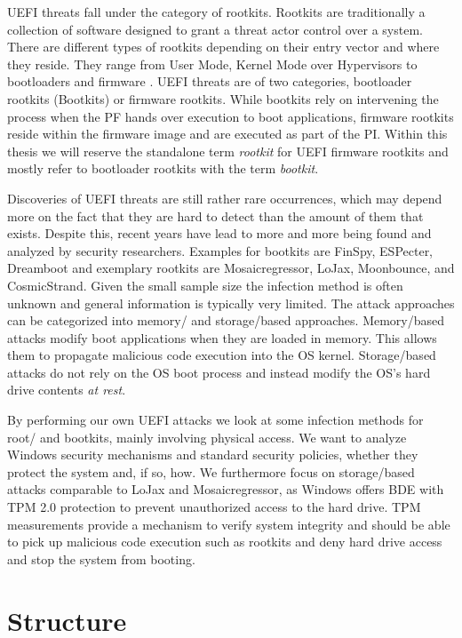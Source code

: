 \ac{UEFI} threats fall under the category of rootkits.
Rootkits are traditionally a collection of software designed to grant a threat actor control over a system.
There are different types of rootkits depending on their entry vector and where they reside.
They range from User Mode, Kernel Mode over Hypervisors to bootloaders and firmware \cite{crowdstrike, techtarget, microsoft-secure-the-windows-boot-process}.
\ac{UEFI} threats are of two categories, bootloader rootkits (Bootkits) or firmware rootkits.
While bootkits rely on intervening the process when the \ac{PF} hands over execution to boot applications, firmware rootkits reside within the firmware image and are executed as part of the \ac{PI}.
Within this thesis we will reserve the standalone term \emph{rootkit} for \ac{UEFI} firmware rootkits and mostly refer to bootloader rootkits with the term \emph{bootkit}.

Discoveries of \ac{UEFI} threats are still rather rare occurrences, which may depend more on the fact that they are hard to detect than the amount of them that exists.
Despite this, recent years have lead to more and more being found and analyzed by security researchers.
Examples for bootkits are FinSpy, ESPecter, Dreamboot and exemplary rootkits are Mosaicregressor, LoJax, Moonbounce, and CosmicStrand.
Given the small sample size the infection method is often unknown and general information is typically very limited.
The attack approaches can be categorized into memory\-/ and storage\-/based approaches.
Memory\-/based attacks modify boot applications when they are loaded in memory.
This allows them to propagate malicious code execution into the \ac{OS} kernel.
Storage\-/based attacks do not rely on the \ac{OS} boot process and instead modify the \ac{OS}'s hard drive contents \emph{at rest}.

By performing our own \ac{UEFI} attacks we look at some infection methods for root\-/ and bootkits, mainly involving physical access.
We want to analyze Windows security mechanisms and standard security policies, whether they protect the system and, if so, how.
We furthermore focus on storage\-/based attacks comparable to LoJax and Mosaicregressor, as Windows offers \ac{BDE} with \ac{TPM} 2.0 protection to prevent unauthorized access to the hard drive.
\ac{TPM} measurements provide a mechanism to verify system integrity and should be able to pick up malicious code execution such as rootkits and deny hard drive access and stop the system from booting.

\section*{Structure}


